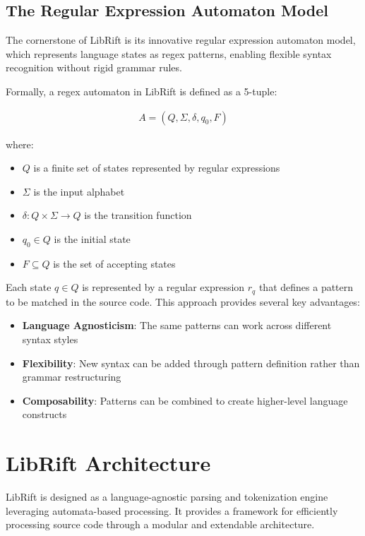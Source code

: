 \documentclass{article}
\begin{document}
\subsection{The Regular Expression Automaton Model}

The cornerstone of LibRift is its innovative regular expression automaton model, which represents language states as regex patterns, enabling flexible syntax recognition without rigid grammar rules.

Formally, a regex automaton in LibRift is defined as a 5-tuple:

\begin{align}
A = (Q, \Sigma, \delta, q_0, F)
\end{align}

where:

\begin{itemize}
    \item $Q$ is a finite set of states represented by regular expressions
    \item $\Sigma$ is the input alphabet
    \item $\delta : Q \times \Sigma \rightarrow Q$ is the transition function
    \item $q_0 \in Q$ is the initial state
    \item $F \subseteq Q$ is the set of accepting states
\end{itemize}

Each state $q \in Q$ is represented by a regular expression $r_q$ that defines a pattern to be matched in the source code. This approach provides several key advantages:

\begin{itemize}
    \item \textbf{Language Agnosticism}: The same patterns can work across different syntax styles
    \item \textbf{Flexibility}: New syntax can be added through pattern definition rather than grammar restructuring
    \item \textbf{Composability}: Patterns can be combined to create higher-level language constructs
\end{itemize}

\section{LibRift Architecture}

LibRift is designed as a language-agnostic parsing and tokenization engine leveraging automata-based processing. It provides a framework for efficiently processing source code through a modular and extendable architecture.
\end{document}
